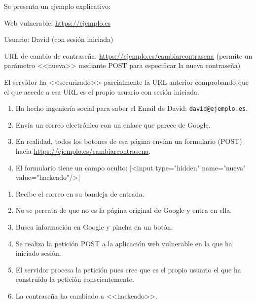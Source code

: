 Se presenta un ejemplo explicativo:

\begin{tcolorbox}[colback=cyan!5!white,colframe=cyan!75!black,title=Situación]
Web vulnerable: \url{https://ejemplo.es}

Usuario: David (con sesión iniciada)

URL de cambio de contraseña: \url{https://ejemplo.es/cambiarcontrasena} (permite
un parámetro <<nueva>> mediante POST para especificar la nueva contraseña)

El servidor ha <<securizado>> parcialmente la URL anterior comprobando que el
que accede a esa URL es el propio usuario con sesión iniciada.
\end{tcolorbox}


\begin{tcolorbox}[colback=red!5!white,colframe=red!75!black,title=Atacante]
    \begin{enumerate}
        \item Ha hecho ingeniería social para saber el Email de David:
        \mbox{\texttt{david@ejemplo.es}}.
        \item Envía un correo electrónico con un enlace que parece de Google.
        \item En realidad, todos los botones de esa página envían un formulario (POST)
        hacia \url{https://ejemplo.es/cambiarcontrasena}.
        \item El formulario tiene un campo oculto:
        |<input type="hidden" name="nueva" value="hackeado"/>|
    \end{enumerate}
\end{tcolorbox}

\begin{tcolorbox}[colback=green!5!white,colframe=green!75!black,title=David]
    \begin{enumerate}
        \item Recibe el correo en su bandeja de entrada.
        \item No se percata de que no es la página original de Google y entra en ella.
        \item Busca información en Google y pincha en un botón.
        \item Se realiza la petición POST a la aplicación web vulnerable en la que ha iniciado sesión.
        \item El servidor procesa la petición pues cree que es el propio usuario el que ha
        construido la petición conscientemente.
        \item La contraseña ha cambiado a <<hackeado>>.
    \end{enumerate}
\end{tcolorbox}

